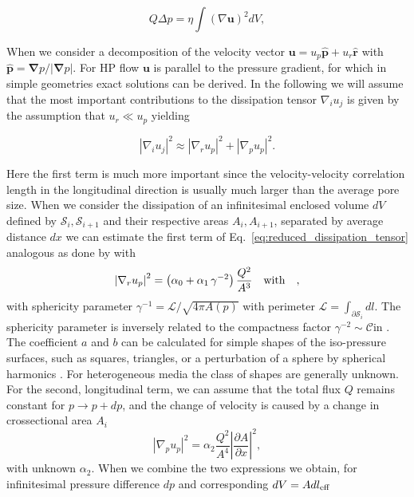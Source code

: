 \documentclass[draft]{agujournal2019}
\begin{document}
\begin{equation}\label{eq:pore_based_energy_dissipation}
Q \Delta p=\eta \int (\nabla \mathbf{u})^2 dV,
\end{equation}

When we consider a decomposition of the velocity vector  $\mathbf{u} = u_p \mathbf{\hat{p}} + u_r \mathbf{\hat{r}}$ with $\mathbf{\hat{p}} =\mathbf{ \nabla}p/|\mathbf{ \nabla}p|$. For HP flow $\mathbf{u}$ is parallel to the pressure gradient, for which in simple geometries exact solutions can be derived. In the following we will assume that the most important contributions to the dissipation tensor $\nabla_i u_j$ is given by the assumption that $u_r \ll u_p $ yielding 

\begin{equation}\label{eq:reduced_dissipation_tensor}
\left|\nabla_i u_j\right|^2 \approx  \left|\nabla_r u_p\right|^2 + \left|\nabla_p u_p\right|^2 .
\end{equation}

Here the first term is much more important since the velocity-velocity correlation length in the longitudinal direction is usually much larger than the average pore size. When we consider the dissipation of an infinitesimal enclosed volume $dV$ defined by $\mathcal{S}_i,\mathcal{S}_{i+1}$ and their respective areas $A_i, A_{i+1}$, separated by average distance $dx$ we can estimate the first term of Eq.~\ref{eq:reduced_dissipation_tensor} analogous as done by \cite{mortensen_reexamination_2005} with
\begin{equation}
	\left|\nabla_r u_p\right|^2 = \left(\alpha_0+\alpha_1\,\gamma^{-2}\right)\frac{ Q^2}{A^3}~~~ \rm{with}~~~ ,
\end{equation}
with sphericity parameter $\gamma^{-1} = \mathcal{L}/\sqrt{ 4\pi A(p)}$ with perimeter $\mathcal{L} = \int_{\partial \mathcal{S}_i}dl$. The sphericity parameter is inversely related to the compactness factor $\gamma^{-2}\sim \mathcal{C} $in \cite{mortensen_reexamination_2005}. The coefficient $a$ and $b$ can be calculated for simple shapes of the iso-pressure surfaces, such as squares, triangles, or a perturbation of a sphere by spherical harmonics . For heterogeneous media the class of shapes are generally unknown. For the second, longitudinal term, we can assume that the total flux $Q$ remains constant for $p\rightarrow p+dp$, and the change of velocity is caused by a change in crossectional area $A_i$
\begin{equation}
	\left|\nabla_p u_p\right|^2 = \alpha_2  \frac{Q^2}{A^4}\left|\frac{\partial A}{\partial x }\right|^2,
\end{equation}
with unknown $\alpha_2$. When we combine the two expressions we obtain, for infinitesimal pressure difference $d p$ and corresponding $dV = A dl_{\rm{eff}}$
\end{document}
